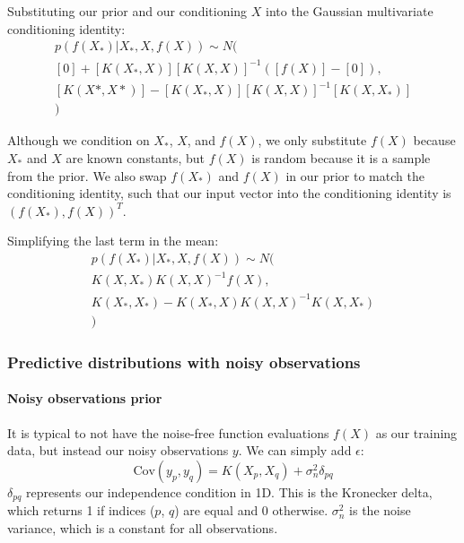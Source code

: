 Substituting our prior and our conditioning $X$ into the Gaussian multivariate conditioning identity:
\begin{equation*}
    \begin{aligned}
        p(f(X_*)|X_*, X, f(X)) \sim N( \\
        [0] + [K(X_*,X)][K(X,X)]^{-1}([f(X)] - [0]), \\
        [K(X*,X*)] - [K(X_*,X)][K(X,X)]^{-1}[K(X,X_*)] \\
        )
    \end{aligned}
\end{equation*}

Although we condition on $X_*$, $X$, and $f(X)$, we only substitute $f(X)$ because $X_*$ and $X$ are known constants, but $f(X)$ is random because it is a sample from the prior. We also swap $f(X_*)$ and $f(X)$ in our prior to match the conditioning identity, such that our input vector into the conditioning identity is $(f(X_*), f(X))^T$.
    
Simplifying the last term in the mean:
\begin{equation} \label{eq:conditioning}
    \begin{aligned}
        p(f(X_*)|X_*, X, f(X)) \sim N( \\
        K(X,X_*)K(X,X)^{-1}f(X), \\
        K(X_*,X_*) - K(X_*,X)K(X,X)^{-1}K(X,X_*) \\
        )
    \end{aligned}
\end{equation}


\subsubsection{Predictive distributions with noisy observations}
\paragraph{Noisy observations prior}
It is typical to not have the noise-free function evaluations $f(X)$ as our training data, but instead our noisy observations $y$. We can simply add $\epsilon$:
\begin{equation*}
    \text{Cov}(y_p, y_q) = K(X_p, X_q) + \sigma^2_n\delta_{pq}
\end{equation*}
$\delta_{pq}$ represents our independence condition in 1D. This is the Kronecker delta, which returns 1 if indices ($p$, $q$) are equal and 0 otherwise. $\sigma^2_n$ is the noise variance, which is a constant for all observations.
    

